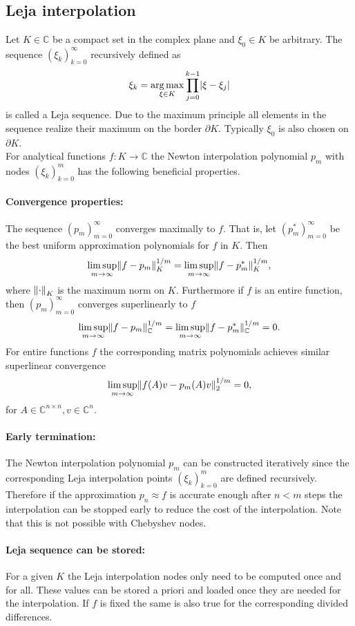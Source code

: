 \documentclass{scrartcl}
\begin{document}
\subsection{Leja interpolation} \label{sec:LejaInterpolation}
	Let $K\in\mathbb{C}$ be a compact set in the complex plane and $\xi_0\in K$ be arbitrary. The sequence $(\xi_k)_{k=0}^{\infty}$ recursively defined as
	\[\xi_k = \underset{{\xi\in K}}{\operatorname{arg\,max}}\displaystyle\prod_{j=0}^{k-1}\lvert\xi-\xi_j\rvert\]
	is called a Leja sequence. Due to the maximum principle all elements in the sequence realize their maximum on the border $\partial K$. Typically $\xi_0$ is also chosen on $\partial K$.\\
	For analytical functions $f\!:K\to\mathbb{C}$ the Newton interpolation polynomial $p_m$ with nodes $(\xi_k)_{k=0}^{m}$ has the following beneficial properties. 
	\paragraph{Convergence properties:}
	The sequence $(p_m)_{m=0}^\infty$ converges maximally to $f$. That is, let $(p_m^{*})_{m=0}^\infty$ be the best uniform approximation polynomials for $f$ in $K$. Then
	\[\limsup\limits_{m \rightarrow \infty}\lVert f-p_m\rVert_{K}^{1/m} = \limsup\limits_{m \rightarrow \infty}\lVert f-p_m^{*}\rVert_{K}^{1/m},\]
	where ${\lVert\cdot\rVert}_K$ is the maximum norm on $K$. Furthermore if $f$ is an entire function, then $(p_m)_{m=0}^\infty$ converges superlinearly to $f$
	\[\limsup\limits_{m \rightarrow \infty}\lVert f-p_m\rVert_{\mathbb{C}}^{1/m} = \limsup\limits_{m \rightarrow \infty}\lVert f-p_m^{*}\rVert_{\mathbb{C}}^{1/m} = 0. \]
	For entire functions $f$ the corresponding matrix polynomials achieves similar superlinear convergence
	\[\limsup\limits_{m \rightarrow \infty}\lVert f(A)v-p_m(A)v\rVert_{2}^{1/m} = 0, \]
	for $A\in\mathbb{C}^{n\times n}, v\in\mathbb{C}^n$.
	
	\paragraph{Early termination:}
	The Newton interpolation polynomial $p_m$ can be constructed iteratively since the corresponding Leja interpolation points $(\xi_k)_{k=0}^{m}$ are defined recursively. Therefore if the approximation $p_n \approx f$ is accurate enough after $n<m$ steps the interpolation can be stopped early to reduce the cost of the interpolation. Note that this is not possible with Chebyshev nodes.
	
	\paragraph{Leja sequence can be stored:}
	For a given $K$ the Leja interpolation nodes only need to be computed once and for all. These values can be stored a priori and loaded once they are needed for the interpolation. If $f$ is fixed the same is also true for the corresponding divided differences.\\
	
\end{document}
